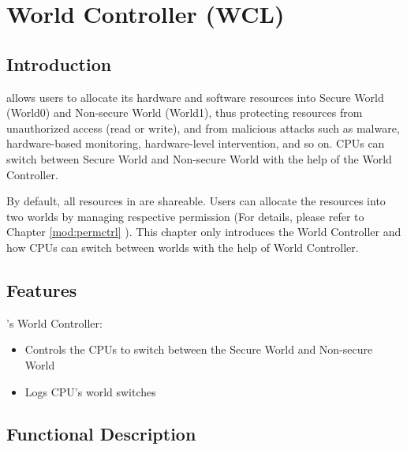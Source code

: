 \documentclass[main\_\_EN.tex]{subfiles}
\begin{document}

\ifglobal
\else
    {\let\clearpage\relax \listoftodos}
    {\let\clearpage\relax \listofdonetodos}
    \tableofcontents
\fi



\hypertarget{wctrl}{}
\chapter{World Controller (WCL)}\label{mod:wctrl}
\section{Introduction}
\chipname{} allows users to allocate its hardware and software resources into Secure World (World0) and Non-secure World (World1), thus protecting resources from unauthorized access (read or write), and from malicious attacks such as malware, hardware-based monitoring, hardware-level intervention, and so on. CPUs can switch between Secure World and Non-secure World with the help of the World Controller.

By default, all resources in \chipname{} are shareable. Users can allocate the resources into two worlds by managing respective permission (For details, please refer to Chapter \ref{mod:permctrl} \textit{}). This chapter only introduces the World Controller and how CPUs can switch between worlds with the help of World Controller.

\section{Features}
\label{sec:alias-features}

\chipname{}'s World Controller:
\begin{itemize}
    \item Controls the CPUs to switch between the Secure World and Non-secure World
    \item Logs CPU's world switches
\end{itemize}

\section{Functional Description}
\label{sec:34-WCTRL-func-descr}
\end{document}
